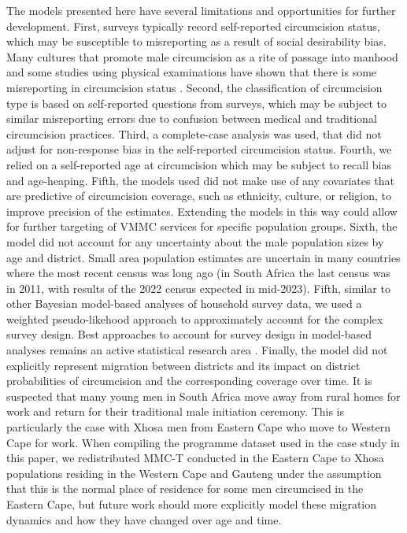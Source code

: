 \documentclass{article}
\begin{document}
The models presented here have several limitations and opportunities for further development. First, surveys typically record self-reported circumcision status, which may be susceptible to misreporting as a result of social desirability bias. Many cultures that promote male circumcision as a rite of passage into manhood and some studies using physical examinations have shown that there is some misreporting in circumcision status \autocite{lagarde2003acceptability, lissouba2011adult}. Second, the classification of circumcision type is based on self-reported questions from surveys, which may be subject to similar misreporting errors due to confusion between medical and traditional circumcision practices. Third, a complete-case analysis was used, that did not adjust for non-response bias in the self-reported circumcision status. Fourth, we relied on a self-reported age at circumcision which may be subject to recall bias and age-heaping. Fifth, the models used did not make use of any covariates that are predictive of circumcision coverage, such as ethnicity, culture, or religion, to improve precision of the estimates. Extending the models in this way could allow for further targeting of VMMC services for specific population groups. Sixth, the model did not account for any uncertainty about the male population sizes by age and district. Small area population estimates are uncertain in many countries where the most recent census was long ago (in South Africa the last census was in 2011, with results of the 2022 census expected in mid-2023). Fifth, similar to other Bayesian model-based analyses of household survey data, we used a weighted pseudo-likehood approach to approximately account for the complex survey design. Best approaches to account for survey design in model-based analyses remains an active statistical research area \autocite{gelman2007struggles, chen2014use}. Finally, the model did not explicitly represent migration between districts and its impact on district probabilities of circumcision and the corresponding coverage over time. It is suspected that many young men in South Africa move away from rural homes for work and return for their traditional male initiation ceremony. This is particularly the case with Xhosa men from Eastern Cape who move to Western Cape for work. When compiling the programme dataset used in the case study in this paper, we redistributed MMC-T conducted in the Eastern Cape to Xhosa populations residing in the Western Cape and Gauteng under the assumption that this is the normal place of residence for some men circumcised in the Eastern Cape, but future work should more explicitly model these migration dynamics and how they have changed over age and time.
\end{document}
